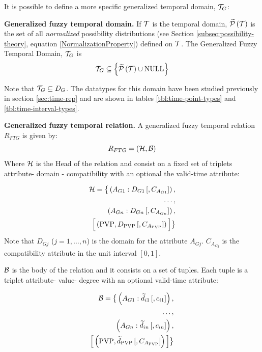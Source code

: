 It is possible to define a more specific generalized temporal domain, $\mathcal{T}_G$:

\begin{definition}
\label{def:generalized-fuzzy-temporal-domain}
\textbf{Generalized fuzzy temporal domain.}
If $\mathcal{T}$ is the temporal domain, $\widetilde {\mathcal{P}}\left( \mathcal{T}\right)$ is the set of all \emph{normalized} possibility distributions (see Section \ref{subsec:possibility-theory}, equation \eqref{NormalizationProperty}) defined on $\mathcal{T}$.
The Generalized Fuzzy Temporal Domain, $\mathcal{T}_G$ is
\begin{equation}
\mathcal{T}_G \subseteq \left \lbrace \widetilde {\mathcal{P}}\left( \mathcal{T}\right) \cup \text{NULL} \right \rbrace
\end{equation}
\end{definition}

Note that $\mathcal{T}_G \subseteq D_G$. The datatypes for this domain have been studied previously in section \ref{sec:time-rep} and are shown in tables \ref{tbl:time-point-types} and \ref{tbl:time-interval-types}.



\begin{definition}
\textbf{Generalized fuzzy temporal relation.}
A generalized fuzzy temporal relation $R_{FTG}$ is given by:
\label{def:generalized-fuzzy-temporal-relation}
\begin{equation}
\label{eq:generalized-fuzzy-temporal-relation}
R_{FTG} = \left(\mathcal{H}, \mathcal{B} \right)
\end{equation}
Where $\mathcal{H}$ is the Head of the relation and consist on a fixed set of triplets attribute- domain - compatibility with an optional the valid-time attribute:

\begin{align}
\label{eq:head-valid-time}
\mathcal{H} = \big \lbrace \left(A_{G1}:D_{G1}\left[,C_{A_{G1}} \right] \right),\\
\nonumber
 \ldots,\\
 \nonumber
  \left(A_{Gn}:D_{Gn}\left[,C_{A_{Gn}} \right] \right),\\
  \nonumber
  \Big[  \left( \text{PVP}, D_{\text{PVP}}\left[,C_{A_{\text{PVP}}} \right] \right) \Big] \big \rbrace
\end{align}
Note that $D_{Gj}$ ($j = 1, \ldots, n$) is the domain for the attribute $A_{Gj}$. $C_{A_{Gj}}$ is the compatibility attribute in the unit interval $\left[0, 1 \right]$.

$\mathcal{B}$ is the body of the relation and it consists on a set of tuples. Each tuple is a triplet attribute- value- degree with an optional valid-time attribute:

\begin{align}
\label{eq:body-valid-time}
\mathcal{B} = \big \lbrace \left(A_{G1}:\widetilde{d}_{i1}\left[,c_{i1} \right] \right),\\
\nonumber
 \ldots,\\
 \nonumber
  \left(A_{Gn}:\widetilde{d}_{in}\left[,c_{in} \right] \right),\\
  \nonumber
   \Big[  \left( \text{PVP}, \widetilde{d}_{\text{PVP}} \left[,C_{A_{\text{PVP}}} \right] \right)  \Big] \big \rbrace
\end{align}

\end{definition}



